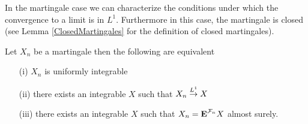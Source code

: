 In the martingale case we can characterize the conditions under which
the convergence to a limit is in $L^1$.  Furthermore in this case, the
martingale is closed (see Lemma \ref{ClosedMartingales} for the
definition of closed martingales).
\begin{thm}\label{L1MartingaleConvergenceTheoremDiscrete}Let $X_n$ be a martingale then the following are equivalent
\begin{itemize}
\item[(i)]$X_n$ is uniformly
  integrable
\item[(ii)]there exists an integrable $X$  such that
  $X_n \overset{L^1}\to X$
\item[(iii)]there exists an integrable $X$ such that
  $X_n = \textbf{E}^{\mathcal{F}_n} X$ almost surely.
\end{itemize}
\end{thm}
